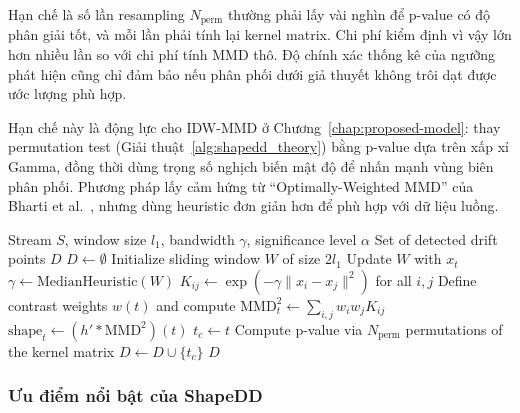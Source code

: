 Hạn chế là số lần resampling $N_{\text{perm}}$ thường phải lấy vài nghìn để p-value có độ phân giải tốt, và mỗi lần phải tính lại kernel matrix. Chi phí kiểm định vì vậy lớn hơn nhiều lần so với chi phí tính MMD thô. Độ chính xác thống kê của ngưỡng phát hiện cũng chỉ đảm bảo nếu phân phối dưới giả thuyết không trôi dạt được ước lượng phù hợp.

Hạn chế này là động lực cho IDW-MMD ở Chương~\ref{chap:proposed-model}: thay permutation test (Giải thuật~\ref{alg:shapedd_theory}) bằng p-value dựa trên xấp xỉ Gamma, đồng thời dùng trọng số nghịch biến mật độ để nhấn mạnh vùng biên phân phối. Phương pháp lấy cảm hứng từ ``Optimally-Weighted MMD'' của Bharti et al.~\cite{bharti2023owmmd}, nhưng dùng heuristic đơn giản hơn để phù hợp với dữ liệu luồng.

\begin{algorithm}[H]
	\caption{Shape-based Drift Detector (ShapeDD)}
	\label{alg:shapedd_theory}
	\begin{algorithmic}[1]
		\Require Stream $S$, window size $l_1$, bandwidth $\gamma$, significance level $\alpha$
		\Ensure Set of detected drift points $D$
		\State $D \leftarrow \emptyset$
		\State Initialize sliding window $W$ of size $2l_1$
			\State Update $W$ with $x_t$
				\State $\gamma \leftarrow \text{MedianHeuristic}(W)$ 
				\State $K_{ij} \leftarrow \exp\!\left(-\gamma\|x_i - x_j\|^2\right)$ for all $i,j$ 
				\State Define contrast weights $w(t)$ and compute $\text{MMD}^2_t \leftarrow \sum_{i,j} w_i w_j K_{ij}$
				\State $\text{shape}_t \leftarrow (h' * \text{MMD}^2)(t)$ 
				 
					\State $t_c \leftarrow t$
					\State Compute p-value via $N_{\text{perm}}$ permutations of the kernel matrix
						\State $D \leftarrow D \cup \{t_c\}$ 
					\EndIf
				\EndIf
			\EndIf
		\EndFor
		\Return $D$
	\end{algorithmic}
\end{algorithm}

\subsubsection{Ưu điểm nổi bật của ShapeDD}

